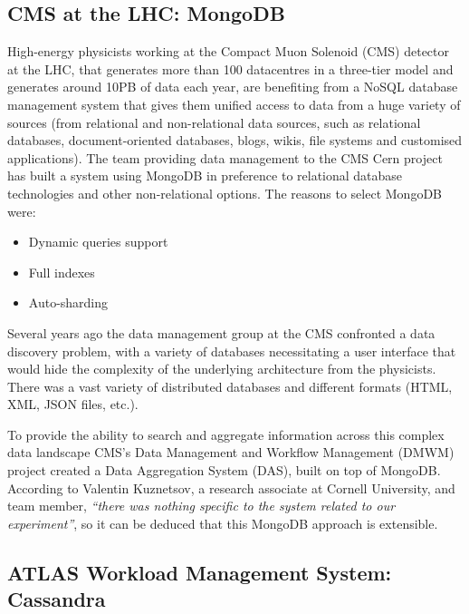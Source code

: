 \subsection{CMS at the LHC: MongoDB} %
\label{sub:cms_at_the_lhc_mongodb}
High-energy physicists working at the Compact Muon Solenoid (CMS) detector at the LHC, that generates more than 100 datacentres in a three-tier model and generates around 10PB of data each year, are benefiting from a NoSQL database management system that gives them unified access to data from a huge variety of sources (from relational and non-relational data sources, such as relational databases, document-oriented databases, blogs, wikis, file systems and customised applications). The team providing data management to the CMS Cern project has built a system using MongoDB in preference to relational database technologies and other non-relational options. The reasons to select MongoDB were:

\begin{itemize}
\item Dynamic queries support
\item Full indexes
\item Auto-sharding
\end{itemize}

Several years ago the data management group at the CMS confronted a data discovery problem, with a variety of databases necessitating a user interface that would hide the complexity of the underlying architecture from the physicists. There was a vast variety of distributed databases and different formats (HTML, XML, JSON files, etc.).

To provide the ability to search and aggregate information across this complex data landscape CMS's Data Management and Workflow Management (DMWM) project created a
Data Aggregation System (DAS),
built on
top of
MongoDB.  According to Valentin Kuznetsov, a research associate at Cornell University, and team member, \emph{``there was nothing specific to the system related to our experiment''}, so it can be deduced that this MongoDB approach is extensible.


\subsection{ATLAS Workload Management System: Cassandra} %
\label{sub:atlas_workload_management_system_cassandra}

